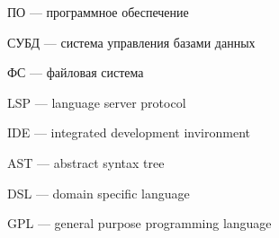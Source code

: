 
\hypertarget{ПО}{ПО --- программное обеспечение}

\hypertarget{СУБД}{СУБД --- система управления базами данных}

\hypertarget{ФС}{ФС --- файловая система}

\hypertarget{LSP}{LSP --- language server protocol}

\hypertarget{IDE}{IDE --- integrated development invironment}

\hypertarget{AST}{AST --- abstract syntax tree}

\hypertarget{DSL}{DSL --- domain specific language}

\hypertarget{GPL}{GPL --- general purpose programming language}

\clearpage